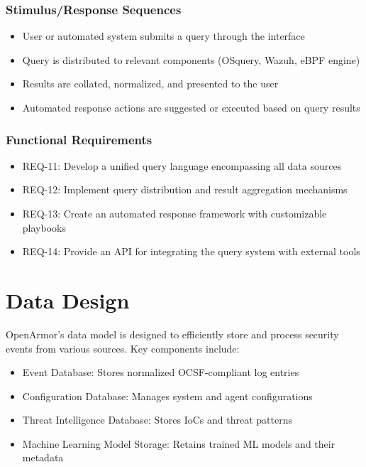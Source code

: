 \subsubsection{Stimulus/Response Sequences}
\begin{itemize}
    \item User or automated system submits a query through the interface
    \item Query is distributed to relevant components (OSquery, Wazuh, eBPF engine)
    \item Results are collated, normalized, and presented to the user
    \item Automated response actions are suggested or executed based on query results
\end{itemize}

\subsubsection{Functional Requirements}
\begin{itemize}
    \item REQ-11: Develop a unified query language encompassing all data sources
    \item REQ-12: Implement query distribution and result aggregation mechanisms
    \item REQ-13: Create an automated response framework with customizable playbooks
    \item REQ-14: Provide an API for integrating the query system with external tools
\end{itemize}

\section{Data Design}
OpenArmor's data model is designed to efficiently store and process security events from various sources. Key components include:

\begin{itemize}
    \item Event Database: Stores normalized OCSF-compliant log entries
    \item Configuration Database: Manages system and agent configurations
    \item Threat Intelligence Database: Stores IoCs and threat patterns
    \item Machine Learning Model Storage: Retains trained ML models and their metadata
\end{itemize}

